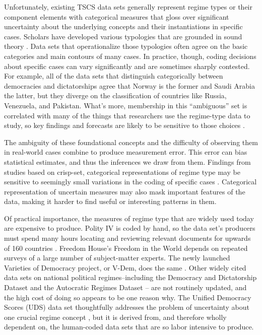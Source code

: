 \documentclass[pdftex,12pt,fullpage,oneside]{amsart}
\begin{document}
Unfortunately, existing TSCS data sets generally represent regime types or their component elements with categorical measures that gloss over significant uncertainty about the underlying concepts and their instantiations in specific cases. Scholars have developed various typologies that are grounded in sound theory \cite{boix:etal:2012,cheibub:etal:2010,geddes:1999,hadenius:teorell:2007,marshall:jaggers:2002}. Data sets that operationalize those typologies often agree on the basic categories and main contours of many cases. In practice, though, coding decisions about specific cases can vary significantly and are sometimes sharply contested. For example, all of the data sets that distinguish categorically between democracies and dictatorships agree that Norway is the former and Saudi Arabia the latter, but they diverge on the classification of countries like Russia, Venezuela, and Pakistan. What's more, membership in this ``ambiguous'' set is correlated with many of the things that researchers use the regime-type data to study, so key findings and forecasts are likely to be sensitive to those choices \cite{casper:tufis:2003,wilson:2014}.

The ambiguity of these foundational concepts and the difficulty of observing them in real-world cases combine to produce measurement error. This error can bias statistical estimates, and thus the inferences we draw from them. Findings from studies based on crisp-set, categorical representations of regime type may be sensitive to seemingly small variations in the coding of specific cases \citep{casper:tufis:2003}. Categorical representation of uncertain measures may also mask important features of the data, making it harder to find useful or interesting patterns in them.

Of practical importance, the measures of regime type that are widely used today are expensive to produce. Polity IV is coded by hand, so the data set's producers must spend many hours locating and reviewing relevant documents for upwards of 160 countries \citep{marshall:jaggers:2002}. Freedom House's Freedom in the World depends on repeated surveys of a large number of subject-matter experts. The newly launched Varieties of Democracy project, or V-Dem, does the same \citep{coppedge:etal:2013}. Other widely cited data sets on national political regimes--including the Democracy and Dictatorship Dataset \citep{cheibub:etal:2010} and the Autocratic Regimes Dataset \citep{geddes:etal:2014} -- are not routinely updated, and the high cost of doing so appears to be one reason why. The Unified Democracy Scores (UDS) data set thoughtfully addresses the problem of uncertainty about one crucial regime concept \citep{pemstein:etal:2010}, but it is derived from, and therefore wholly dependent on, the human-coded data sets that are so labor intensive to produce.
\end{document}
